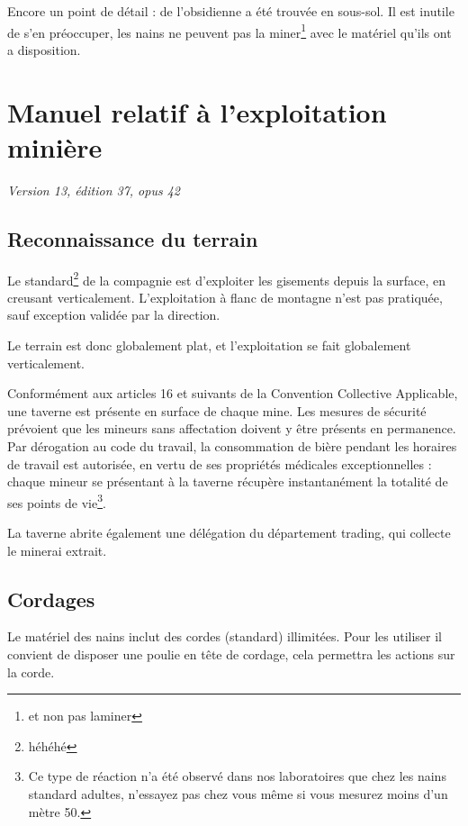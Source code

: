  Encore un point de détail : de l'obsidienne a été trouvée en sous-sol. Il
  est inutile de s'en préoccuper, les nains ne peuvent pas la miner\footnote{et
  non pas laminer} avec le matériel qu'ils ont a disposition.

\newpage

\section{Manuel relatif à l'exploitation minière}

  \textit{Version 13, édition 37, opus 42}

\subsection{Reconnaissance du terrain}

  Le standard\footnote{héhéhé} de la compagnie est d'exploiter les gisements
  depuis la surface, en creusant verticalement. L'exploitation à flanc de
  montagne n'est pas pratiquée, sauf exception validée par la direction.

  Le terrain est donc globalement plat, et l'exploitation se fait globalement
  verticalement.

  Conformément aux articles 16 et suivants de la Convention Collective
  Applicable, une taverne est présente en surface de chaque mine. Les mesures
  de sécurité prévoient que les mineurs sans affectation doivent y être
  présents en permanence. Par dérogation au code du travail, la consommation de
  bière pendant les horaires de travail est autorisée, en vertu de ses
  propriétés médicales exceptionnelles : chaque mineur se présentant à la
  taverne récupère instantanément la totalité de ses points de vie\footnote{Ce
  type de réaction n'a été observé dans nos laboratoires que chez les nains
  standard adultes, n'essayez pas chez vous même si vous mesurez moins d'un
  mètre 50.}.

  La taverne abrite également une délégation du département trading, qui
  collecte le minerai extrait.

\subsection{Cordages}

  Le matériel des nains inclut des cordes (standard) illimitées. Pour les
  utiliser il convient de disposer une poulie en tête de cordage, cela
  permettra les actions sur la corde.

